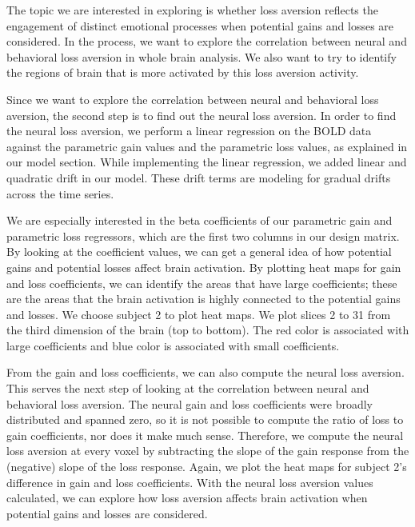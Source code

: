 The topic we are interested in exploring is whether loss aversion reflects 
the engagement of distinct emotional processes when potential gains and 
losses are considered. In the process, we want to explore the correlation 
between neural and behavioral loss aversion in whole brain analysis. We also 
want to try to identify the regions of brain that is more activated by this 
loss aversion activity.

Since we want to explore the correlation between neural and behavioral loss 
aversion, the second step is to find out the neural loss aversion. In order 
to find the neural loss aversion, we perform a linear regression on the BOLD 
data against the parametric gain values and the parametric loss values, as 
explained in our model section. While implementing the linear regression, we 
added linear and quadratic drift in our model. These drift terms are modeling 
for gradual drifts across the time series.

We are especially interested in the beta coefficients of our parametric gain 
and parametric loss regressors, which are the first two columns in our design 
matrix. By looking at the coefficient values, we can get a general idea of 
how potential gains and potential losses affect brain activation. By plotting 
heat maps for gain and loss coefficients, we can identify the areas that have 
large coefficients; these are the areas that the brain activation is highly 
connected to the potential gains and losses. We choose subject 2 to plot heat 
maps. We plot slices 2 to 31 from the third dimension of the brain (top to 
bottom). The red color is associated with large coefficients and blue color 
is associated with small coefficients.

From the gain and loss coefficients, we can also compute the neural loss 
aversion. This serves the next step of looking at the correlation between 
neural and behavioral loss aversion. The neural gain and loss coefficients 
were broadly distributed and spanned zero, so it is not possible to compute 
the ratio of loss to gain coefficients, nor does it make much sense. 
Therefore, we compute the neural loss aversion at every voxel by subtracting 
the slope of the gain response from the (negative) slope of the loss response. 
Again, we plot the heat maps for subject 2’s difference in gain and loss 
coefficients. With the neural loss aversion values calculated, we can explore 
how loss aversion affects brain activation when potential gains and losses are 
considered.

